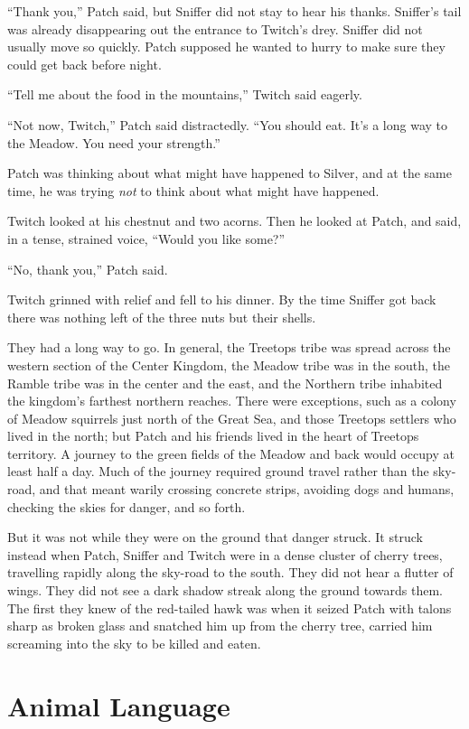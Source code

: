 \documentclass[ebook,oneside,openany,17pt]{memoir}
\renewcommand{\thechapter}{\Roman{chapter}}
\newcounter{sections}
\newcommand{\sections}[1]{%
  \section*{#1}
  \addtocounter{sections}{1}%
  \pdfbookmark[1]{#1}{section.\thechapter.\thesections}}
\begin{document}
“Thank you,” Patch said, but Sniffer did not stay to hear his
thanks. Sniffer’s tail was already disappearing out the entrance to
Twitch’s drey. Sniffer did not usually move so quickly. Patch supposed
he wanted to hurry to make sure they could get back before night.

“Tell me about the food in the mountains,” Twitch said eagerly.

“Not now, Twitch,” Patch said distractedly. “You should eat. It’s a
long way to the Meadow. You need your strength.”

Patch was thinking about what might have happened to Silver, and at
the same time, he was trying \emph{not} to think about what might
have happened.

Twitch looked at his chestnut and two acorns. Then he looked at Patch,
and said, in a tense, strained voice, “Would you like some?”

“No, thank you,” Patch said.

Twitch grinned with relief and fell to his dinner. By the time Sniffer
got back there was nothing left of the three nuts but their shells.

They had a long way to go. In general, the Treetops tribe was spread
across the western section of the Center Kingdom, the Meadow tribe was
in the south, the Ramble tribe was in the center and the east, and the
Northern tribe inhabited the kingdom’s farthest northern
reaches. There were exceptions, such as a colony of Meadow squirrels
just north of the Great Sea, and those Treetops settlers who lived in
the north; but Patch and his friends lived in the heart of Treetops
territory. A journey to the green fields of the Meadow and back would
occupy at least half a day. Much of the journey required ground travel
rather than the sky-road, and that meant warily crossing concrete
strips, avoiding dogs and humans, checking the skies for danger, and
so forth.

But it was not while they were on the ground that danger struck. It
struck instead when Patch, Sniffer and Twitch were in a dense cluster
of cherry trees, travelling rapidly along the sky-road to the
south. They did not hear a flutter of wings. They did not see a dark
shadow streak along the ground towards them. The first they knew of
the red-tailed hawk was when it seized Patch with talons sharp as
broken glass and snatched him up from the cherry tree, carried him
screaming into the sky to be killed and eaten.


\sections{Animal Language}
\end{document}
